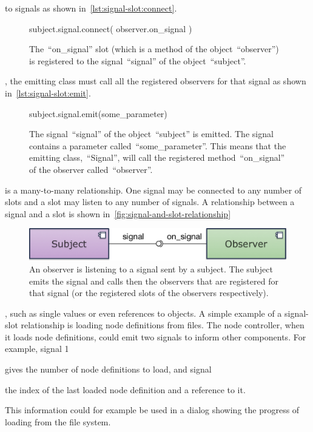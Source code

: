 \documentclass[%
    a4paper,    %
    justified,  %
    nobib,      %
    openany     %
]{tufte-book}
\makeatletter
\renewcommand{\label}[1]{\@tufte@label{##1}}%
\makeatother
\begin{document}
 to signals as shown
in~\cref{lst:signal-slot:connect}.

\begin{figure}[!htbp]
  \begin{pythoncode}
subject.signal.connect(
    observer.on_signal
)
  \end{pythoncode}
  \caption{The~\enquote{on\_signal} slot (which is a method of the
    object~\enquote{observer}) is registered to the signal~\enquote{signal} of
    the object~\enquote{subject}.}
\label{lst:signal-slot:connect}
\end{figure}

, the emitting class must call all the
registered observers for that signal as shown in~\cref{lst:signal-slot:emit}.

\begin{figure}[!htbp]
  \begin{pythoncode}
subject.signal.emit(some_parameter)
  \end{pythoncode}
  \caption{The signal~\enquote{signal} of the object~\enquote{subject} is
    emitted. The signal contains a parameter called~\enquote{some\_parameter}.
    This means that the emitting class,~\enquote{Signal}, will call the
    registered method~\enquote{on\_signal} of the observer
    called~\enquote{observer}.}
\label{lst:signal-slot:emit}
\end{figure}

 is a many-to-many
relationship. One signal may be connected to any number of slots and a slot may
listen to any number of signals. A relationship between a signal and a slot is
shown in~\cref{fig:signal-and-slot-relationship}

\begin{figure}[!htbp]
  \includegraphics[width=0.8\linewidth]{images/signal-and-slot}
  \caption{An observer is listening to a signal sent by a subject. The subject
    emits the signal and calls then the observers that are registered for that
    signal (or the registered slots of the observers respectively).}
\label{fig:signal-and-slot-relationship}
\end{figure}

, such as single values or
even references to objects. A simple example of a signal-slot relationship is
loading node definitions from files. The node controller, when it loads node
definitions, could emit two signals to inform other components. For example,
signal 1
\begin{enumerate*}
  \item gives the number of node definitions to load, and signal
  \item the index of the last loaded node definition and a reference to it.
\end{enumerate*}
This information could for example be used in a dialog showing the progress of
loading from the file system.
\end{document}
